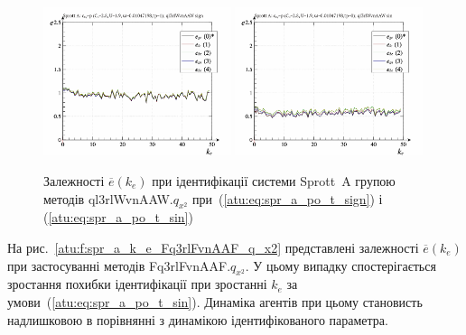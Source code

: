 \begin{figure}[htb!]
  \centerline{
    \includegraphics[width=0.49\textwidth]{p/cha/spr_a/ql3rlWvnAAW_x2/sprott_a_id-p_k_e_sign.png}
    \hfill
    \includegraphics[width=0.49\textwidth]{p/cha/spr_a/ql3rlWvnAAW_x2/sprott_a_id-p_k_e_sin.png}
  }
\caption{Залежності $ \overline{e} (k_e) $ при ідентифікації системи Sprott~A групою методів ql3rlWvnAAW.$ q_{x^2} $ при~(\ref{atu:eq:spr_a_po_t_sign}) і (\ref{atu:eq:spr_a_po_t_sin})}
  \label{atu:f:spr_a_k_e_ql3rlWvnAAW_q_x2}
\end{figure}

На рис.~\ref{atu:f:spr_a_k_e_Fq3rlFvnAAF_q_x2} представлені залежності
$ \overline{e} (k_e) $ при застосуванні методів
Fq3rlFvnAAF.$q_{x^2}$.
У цьому випадку спостерігається зростання похибки
ідентифікації при зростанні
$ k_e $ за умови~(\ref{atu:eq:spr_a_po_t_sin}). Динаміка агентів при цьому
становисть надлишковою в порівнянні з динамікою ідентифікованого
параметра.

